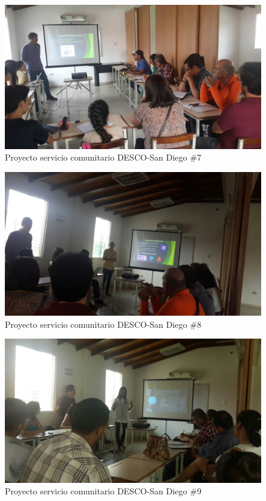 \documentclass[11pt, a4paper, twosides]{report}
\begin{document}

\begin{figure}[h]
    \centering
    \includegraphics[width=1\linewidth]{10.jpg}
    \caption{Proyecto servicio comunitario DESCO-San Diego \#7}
    \label{fig:10}
\end{figure}

\begin{figure}[h]
    \centering
    \includegraphics[width=1\linewidth]{11.jpg}
    \caption{Proyecto servicio comunitario DESCO-San Diego \#8}
    \label{fig:11}
\end{figure}

\begin{figure}[h]
    \centering
    \includegraphics[width=1\linewidth]{12.jpg}
    \caption{Proyecto servicio comunitario DESCO-San Diego \#9}
    \label{fig:12}
\end{figure}
\end{document}
